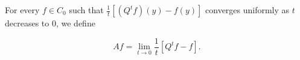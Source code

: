 For every $f \in C_0$ such that $\frac{1}{t}[(Q^t f)(y) - f(y)]$ converges uniformly as $t$ decreases to $0$, we define

$$A f = \lim_{t \to 0} \frac{1}{t} [Q^t f - f].$$
